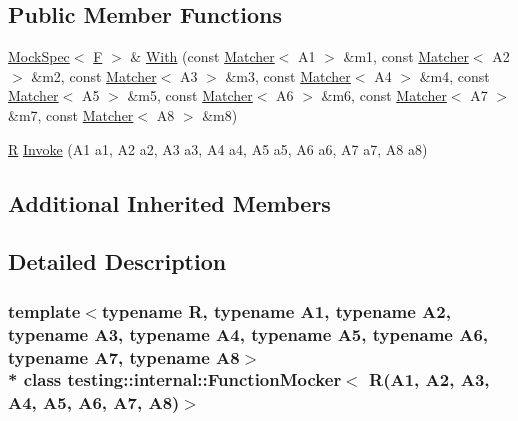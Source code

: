 \subsection*{Public Member Functions}
\begin{DoxyCompactItemize}
\item 
\hyperlink{classtesting_1_1internal_1_1_mock_spec}{Mock\+Spec}$<$ \hyperlink{classtesting_1_1internal_1_1_function_mocker_3_01_r_07_a1_00_01_a2_00_01_a3_00_01_a4_00_01_a5_00_01_a6_00_01_a7_00_01_a8_08_4_ad9749c93b0a17540778c5fa162a5fe6c}{F} $>$ \& \hyperlink{classtesting_1_1internal_1_1_function_mocker_3_01_r_07_a1_00_01_a2_00_01_a3_00_01_a4_00_01_a5_00_01_a6_00_01_a7_00_01_a8_08_4_ab2da711e67ed57fbd473cfc511935927}{With} (const \hyperlink{classtesting_1_1_matcher}{Matcher}$<$ A1 $>$ \&m1, const \hyperlink{classtesting_1_1_matcher}{Matcher}$<$ A2 $>$ \&m2, const \hyperlink{classtesting_1_1_matcher}{Matcher}$<$ A3 $>$ \&m3, const \hyperlink{classtesting_1_1_matcher}{Matcher}$<$ A4 $>$ \&m4, const \hyperlink{classtesting_1_1_matcher}{Matcher}$<$ A5 $>$ \&m5, const \hyperlink{classtesting_1_1_matcher}{Matcher}$<$ A6 $>$ \&m6, const \hyperlink{classtesting_1_1_matcher}{Matcher}$<$ A7 $>$ \&m7, const \hyperlink{classtesting_1_1_matcher}{Matcher}$<$ A8 $>$ \&m8)
\item 
\hyperlink{typedefs__9_8js_afb423b73ee7b6c04d2d54fc06e405404}{R} \hyperlink{classtesting_1_1internal_1_1_function_mocker_3_01_r_07_a1_00_01_a2_00_01_a3_00_01_a4_00_01_a5_00_01_a6_00_01_a7_00_01_a8_08_4_aff60c590ad791fa2a34751fe5a1e51c2}{Invoke} (A1 a1, A2 a2, A3 a3, A4 a4, A5 a5, A6 a6, A7 a7, A8 a8)
\end{DoxyCompactItemize}
\subsection*{Additional Inherited Members}


\subsection{Detailed Description}
\subsubsection*{template$<$typename R, typename A1, typename A2, typename A3, typename A4, typename A5, typename A6, typename A7, typename A8$>$\\*
class testing\+::internal\+::\+Function\+Mocker$<$ R(\+A1, A2, A3, A4, A5, A6, A7, A8)$>$}



